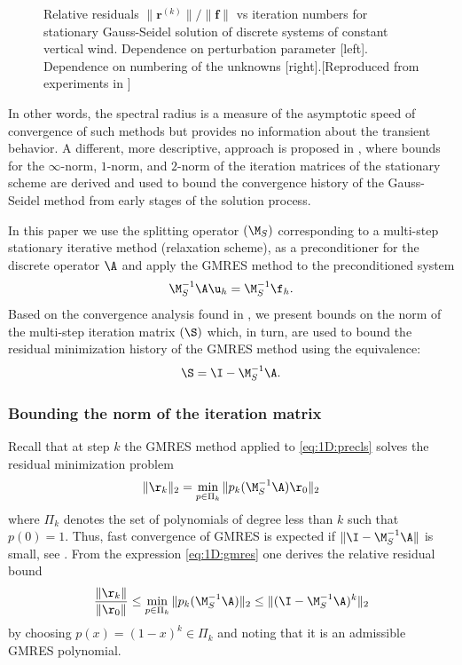 \begin{figure}[h!]
\caption{Relative residuals $\|\mathbf{r}^{(k)}\|/\|\mathbf{f}\|$ vs iteration
numbers for stationary Gauss-Seidel solution of discrete systems of constant
vertical wind. Dependence on perturbation parameter [left]. Dependence on
numbering of the unknowns [right].[Reproduced from experiments in
\cite{ElmSilWat14}]}
\label{fig:1D:GSres}
\end{figure}
%
In other words, the spectral radius is a measure of the asymptotic
speed of convergence of such methods but provides no information about the
transient behavior. A different, more descriptive, approach is proposed in
\cite{ElmChe93}, where bounds for the $\infty$-norm, $1$-norm, and $2$-norm
of the iteration matrices of the stationary scheme are derived and used to
bound the convergence history of the Gauss-Seidel method from early stages of
the solution process.

In this paper we use the splitting operator $(\M_S)$ corresponding to a
multi-step stationary iterative method (relaxation scheme), as a preconditioner
for the discrete operator $\A$ and apply the GMRES method to the preconditioned
system
\begin{equation}\label{eq:1D:precls}
\M_S^{-1}\A \u_h = \M_S^{-1}\f_h.
\end{equation}
Based on the convergence analysis found in \cite{ElmChe93}, we present
bounds on the norm of the multi-step iteration matrix $(\S)$ which, in turn, are
used to bound the residual minimization history of the GMRES method using the
equivalence:
\[\S=\I-\M_S^{-1}\A.\]

\subsubsection{Bounding the norm of the iteration matrix}
Recall that at step $k$ the GMRES method applied to \eqref{eq:1D:precls} solves
the residual minimization problem
\begin{equation}\label{eq:1D:gmres}
\|\r_k\|_2 = \min_{p \in \Pi_{k} }\|p_k(\M_S^{-1}\A)\r_0\|_2
\end{equation}
where $\Pi_{k}$ denotes the set of  polynomials of degree less than $k$ such
that $p(0)=1$. Thus, fast convergence of GMRES is expected if
$\|\I-\M_S^{-1}\A\|$
is small, see \cite[p. 56]{Gre97}.
From the expression \eqref{eq:1D:gmres} one derives the relative residual bound
\begin{equation}\label{eq:1D:resboundmeth3}
\frac{\|\r_k\|}{\|\r_0\|} \leq \min_{p \in \Pi_k} \|p_k(\M_S^{-1}\A)\|_2 \leq
\|(\I-\M_S^{-1}\A)^k\|_2
\end{equation}
by choosing $p(x) = (1-x)^{k} \in \Pi_{k}$ and noting that it is an admissible
GMRES polynomial.

